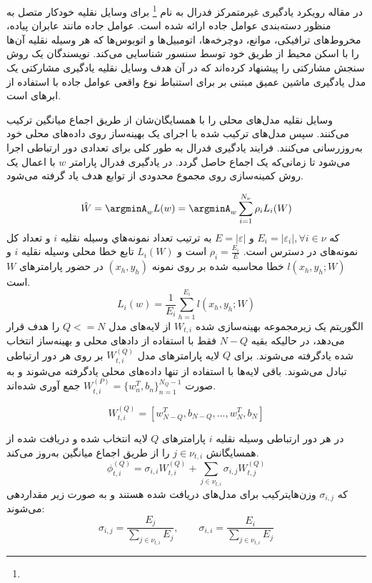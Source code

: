 در مقاله \cite{Fed7} رویکرد یادگیری غیرمتمرکز فدرال به نام \footnote{} برای وسایل نقلیه خودکار متصل به منظور دسته‌بندی عوامل جاده ارائه شده است. عوامل جاده مانند عابران پیاده، مخروط‌های ترافیکی، موانع، دوچرخه‌ها، اتومبیل‌ها و اتوبوس‌ها  که هر وسیله نقلیه آن‌ها را با اسکن محیط از طریق خود توسط سنسور  شناسایی می‌کند. نویسندگان یک روش سنجش مشارکتی را پیشنهاد کرده‌اند که در آن هدف وسایل نقلیه یادگیری مشارکتی یک مدل یادگیری ماشین عمیق مبتنی بر  برای استنباط نوع واقعی عوامل جاده با استفاده از ابرهای  است. 

وسایل نقلیه مدل‌های محلی را با همسایگان‌شان از طریق اجماع میانگین ترکیب می‌کنند. سپس مدل‌های ترکیب شده با اجرای یک بهینه‌ساز روی داده‌های محلی خود به‌روزرسانی می‌کنند. فرایند یادگیری فدرال به طور کلی برای تعدادی دور ارتباطی اجرا می‌شود تا زمانی‌که یک اجماع حاصل گردد. در یادگیری فدرال پارامتر $w$ با اعمال یک روش کمینه‌سازی روی مجموع محدودی از توابع هدف یاد گرفته می‌شود.

\begin{equation}\label{e134}
	\hat{W}=\argminA_w L(w)=\argminA_w \sum_{i=1}^{N_\nu} \rho_i L_i(W)
\end{equation}
که $E_i=|\varepsilon_i|, \forall i\in\nu$ و $E=|\varepsilon|$ به ترتیب تعداد نمونه‌هاي وسیله نقلیه $i$ و تعداد کل نمونه‌های در دسترس است. $\rho_i=\frac{E_i}{E}$ است و $L_i(W)$ تابع خطا محلی وسیله نقلیه $i$ و $l(x_h,y_h;W)$ خطا محاسبه شده بر روی نمونه $(x_h,y_h)$ در حضور پارامترهای $W$ است. 
\begin{equation}\label{e135}
	L_i(w)=\frac{1}{E_i}\sum_{h=1}^{E_i}l(x_h,y_h;W)
\end{equation}
الگوریتم  یک زیرمجموعه بهینه‌سازی شده $W_{t,i}$ از لایه‌های مدل $Q<=N$ را هدف قرار می‌دهد، در حالیکه بقیه $N-Q$ فقط با استفاده از دادهای محلی و بهینه‌ساز انتخاب شده یادگرفته می‌شوند. برای $Q$ لایه پارامترهای مدل $W_{t,i}^{(Q)}$ بر روی هر دور ارتباطی تبادل می‌شوند. باقی لایه‌ها با استفاده از تنها داده‌های محلی یادگرفته می‌شوند و به صورت  $W_{t,i}^{(P)}=\{w_n^T,b_n\}_{n=1}^{N_Q-1}$ جمع آوری شده‌اند.

\begin{equation}\label{e136}
	W_{t,i}^{(Q)}=[w_{N-Q}^T,b_{N-Q},...,w_N^T,b_N]
\end{equation}
 
در هر دور ارتباطی وسیله نقلیه $i$ پارامترهای $Q$ لایه انتخاب شده و دریافت شده از همسایگانش  $j\in \nu_{t,i}$ را از طریق اجماع میانگین به‌روز می‌کند.
\begin{equation}\label{e136}
	\phi_{t,i}^{(Q)}=\sigma_{i,i}W_{t,i}^{(Q)}+\sum_{j\in \nu_{t,i}}\sigma_{i,j}W_{t,j}^{(Q)}
\end{equation}
که $\sigma_{i,j}$ وزن‌هایترکیب برای مدل‌های دریافت شده هستند و به صورت زیر مقداردهی می‌شوند:
\begin{equation}\label{e137}
\sigma_{i,j}=\frac{E_j}{\sum_{j\in \nu_{t,i}}E_j},\qquad \sigma_{i,i}=\frac{E_i}{\sum_{j\in \nu_{t,i}}E_j}
\end{equation}

